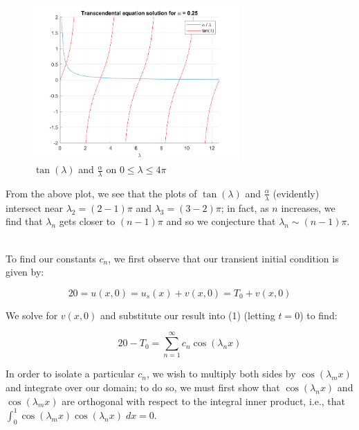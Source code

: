 \begin{solution}
    \begin{figure}[h]
        \centering
        \includegraphics[width=0.7\textwidth]{problem1_transcendental_eigenvalues.png}
        \caption{$\tan(\lambda)$ and $\frac{\alpha}{\lambda}$ on $0 \le \lambda \le 4 \pi$}
    \end{figure}

    \pagebreak

    From the above plot, we see that the plots of $\tan(\lambda)$ and $\frac{\alpha}{\lambda}$ (evidently) intersect near 
    $\lambda_2 = (2 - 1)\pi$ and $\lambda_3 = (3 - 2) \pi$; in fact, as $n$ increases, we find that $\lambda_n$ gets closer
    to $(n - 1) \pi$ and so we conjecture that $\lambda_n \sim (n - 1) \pi$.

    \ \\
    To find our constants $c_n$, we first observe that our transient initial condition is given by:

    $$
        20 = u(x, 0) = u_s(x) + v(x, 0) = T_0 + v(x, 0)
    $$
    
    We solve for $v(x, 0)$ and substitute our result into (1) (letting $t = 0$) to find:

    \begin{equation}
        20 - T_0 = \sum_{n=1}^{\infty}{c_n \cos{(\lambda_n x)}}
    \end{equation}

    In order to isolate a particular $c_n$, we wish to multiply both sides by $\cos{(\lambda_m x)}$ and integrate over our domain;
    to do so, we must first show that $\cos{(\lambda_n x)}$ and $\cos{(\lambda_m x)}$ are orthogonal with respect to the integral 
    inner product, i.e., that
    \linebreak $\int_{0}^{1}{\cos{(\lambda_m x)}\cos{(\lambda_n x)}\; dx} = 0$.

    \pagebreak


\end{solution}
